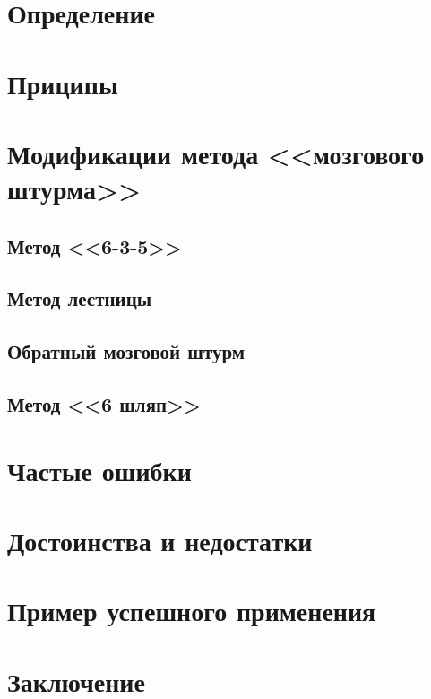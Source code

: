 \documentclass[a4paper,12pt]{article}
\begin{document}


\tableofcontents
\newpage

\section{Определение}


\section{Приципы}


\section{Модификации метода <<мозгового штурма>>}

	\subsection{Метод <<6-3-5>>}
	

	\subsection{Метод лестницы}
	

	\subsection{Обратный мозговой штурм}
	

	\subsection{Метод <<6 шляп>>}
	

\section{Частые ошибки}


\section{Достоинства и недостатки}


\section{Пример успешного применения}


\section{Заключение}

\end{document}
